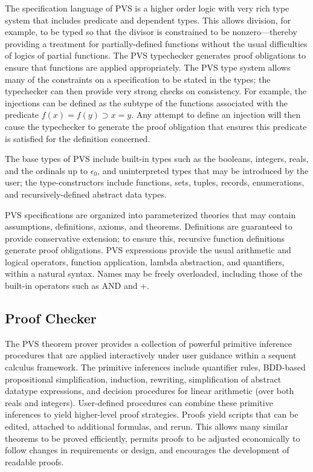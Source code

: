 The specification language of PVS is a higher order logic with very
rich type system that includes predicate and dependent types.  This
allows division, for example, to be typed so that the divisor is
constrained to be nonzero---thereby providing a treatment for
partially-defined functions without the usual difficulties of logics
of partial functions.  The PVS typechecker generates proof obligations
to ensure that functions are applied appropriately.  The PVS type
system allows many of the constraints on a specification to be stated
in the types; the typechecker can then provide very strong checks on
consistency.  For example, the injections can be defined as the
subtype of the functions associated with the predicate $f(x)=f(y)
\supset x=y$.  Any attempt to define an injection will then cause the
typechecker to generate the proof obligation that ensures this
predicate is satisfied for the definition concerned.

The base types of PVS include built-in types such as the booleans,
integers, reals, and the ordinals up to $\epsilon_0$, and uninterpreted
types that may be introduced by the user; the type-constructors
include functions, sets, tuples, records, enumerations, and
recursively-defined abstract data types.  

PVS specifications are organized into parameterized theories that may
contain assumptions, definitions, axioms, and theorems.  Definitions
are guaranteed to provide conservative extension; to ensure this,
recursive function definitions generate proof obligations.  PVS
expressions provide the usual arithmetic and logical operators,
function application, lambda abstraction, and quantifiers, within a
natural syntax.  Names may be freely overloaded, including those of the
built-in operators such as AND and +.

\subsection{Proof Checker}

The PVS theorem prover provides a collection of powerful primitive
inference procedures that are applied interactively under user
guidance within a sequent calculus framework.  The primitive inferences
include quantifier rules, BDD-based propositional simplification,
induction, rewriting, simplification of abstract datatype expressions,
and decision procedures for linear arithmetic (over both reals and
integers).  User-defined procedures can combine these primitive
inferences to yield higher-level proof strategies.  Proofs yield
scripts that can be edited, attached to additional formulas, and
rerun.  This allows many similar theorems to be proved efficiently,
permits proofs to be adjusted economically to follow changes in
requirements or design, and encourages the development of readable
proofs.

